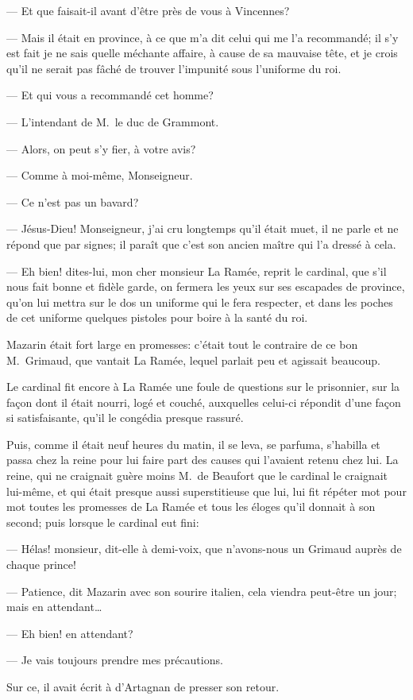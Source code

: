 — Et que faisait-il avant d'être près de vous à Vincennes?

— Mais il était en province, à ce que m'a dit celui qui me l'a recommandé; il s'y est fait je ne sais quelle méchante affaire, à cause de sa mauvaise tête, et je crois qu'il ne serait pas fâché de trouver l'impunité sous l'uniforme du roi.

— Et qui vous a recommandé cet homme?

— L'intendant de M.~le duc de Grammont.

— Alors, on peut s'y fier, à votre avis?

— Comme à moi-même, Monseigneur.

— Ce n'est pas un bavard?

— Jésus-Dieu! Monseigneur, j'ai cru longtemps qu'il était muet, il ne parle et ne répond que par signes; il paraît que c'est son ancien maître qui l'a dressé à cela.

— Eh bien! dites-lui, mon cher monsieur La Ramée, reprit le cardinal, que s'il nous fait bonne et fidèle garde, on fermera les yeux sur ses escapades de province, qu'on lui mettra sur le dos un uniforme qui le fera respecter, et dans les poches de cet uniforme quelques pistoles pour boire à la santé du roi.

Mazarin était fort large en promesses: c'était tout le contraire de ce bon M.~Grimaud, que vantait La Ramée, lequel parlait peu et agissait beaucoup.

Le cardinal fit encore à La Ramée une foule de questions sur le prisonnier, sur la façon dont il était nourri, logé et couché, auxquelles celui-ci répondit d'une façon si satisfaisante, qu'il le congédia presque rassuré.

Puis, comme il était neuf heures du matin, il se leva, se parfuma, s'habilla et passa chez la reine pour lui faire part des causes qui l'avaient retenu chez lui. La reine, qui ne craignait guère moins M.~de Beaufort que le cardinal le craignait lui-même, et qui était presque aussi superstitieuse que lui, lui fit répéter mot pour mot toutes les promesses de La Ramée et tous les éloges qu'il donnait à son second; puis lorsque le cardinal eut fini:

— Hélas! monsieur, dit-elle à demi-voix, que n'avons-nous un Grimaud auprès de chaque prince!

— Patience, dit Mazarin avec son sourire italien, cela viendra peut-être un jour; mais en attendant\dots

— Eh bien! en attendant?

— Je vais toujours prendre mes précautions.

Sur ce, il avait écrit à d'Artagnan de presser son retour.